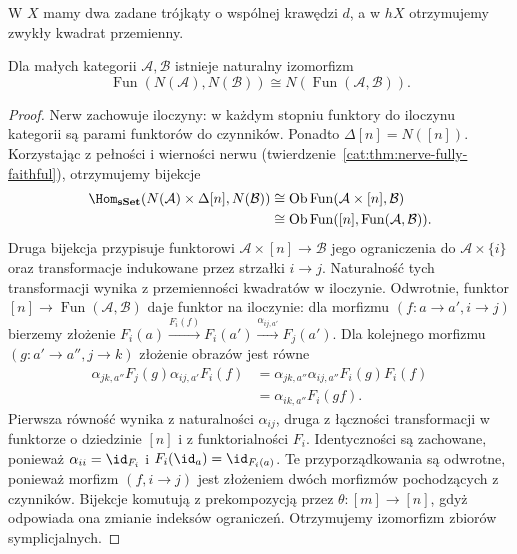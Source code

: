\begin{center}
\end{center}
W $X$ mamy dwa zadane trójkąty o wspólnej krawędzi $d$, a w $hX$ otrzymujemy zwykły kwadrat przemienny.

\begin{stwierdzenie}\label{cat:prop:quasicat-functor-nerve}
Dla małych kategorii $\mathcal A,\mathcal B$ istnieje naturalny izomorfizm
\[
 \operatorname{Fun}(N(\mathcal A),N(\mathcal B))
 \cong N(\operatorname{Fun}(\mathcal A,\mathcal B)).
\]
\end{stwierdzenie}
\begin{proof}
Nerw zachowuje iloczyny: w każdym stopniu funktory do iloczynu kategorii są parami funktorów do czynników. Ponadto $\Delta[n]=N([n])$. Korzystając z pełności i wierności nerwu (twierdzenie~\ref{cat:thm:nerve-fully-faithful}), otrzymujemy bijekcje
\[
\begin{aligned}
 \Hom_{\mathbf{sSet}}(N(\mathcal A)\times\Delta[n],N(\mathcal B))
 &\cong\operatorname{Ob}\operatorname{Fun}(\mathcal A\times[n],\mathcal B)\\
 &\cong\operatorname{Ob}\operatorname{Fun}([n],\operatorname{Fun}(\mathcal A,\mathcal B)).
\end{aligned}
\]
Druga bijekcja przypisuje funktorowi $\mathcal A\times[n]\to\mathcal B$ jego ograniczenia do $\mathcal A\times\{i\}$ oraz transformacje indukowane przez strzałki $i\to j$. Naturalność tych transformacji wynika z przemienności kwadratów w iloczynie. Odwrotnie, funktor $[n]\to\operatorname{Fun}(\mathcal A,\mathcal B)$ daje funktor na iloczynie: dla morfizmu $(f:a\to a',i\to j)$ bierzemy złożenie $F_i(a)\xrightarrow{F_i(f)}F_i(a')\xrightarrow{\alpha_{ij,a'}}F_j(a')$. Dla kolejnego morfizmu $(g:a'\to a'',j\to k)$ złożenie obrazów jest równe
\[
\begin{aligned}
 \alpha_{jk,a''}F_j(g)\alpha_{ij,a'}F_i(f)
 &=\alpha_{jk,a''}\alpha_{ij,a''}F_i(g)F_i(f)\\
 &=\alpha_{ik,a''}F_i(gf).
\end{aligned}
\]
Pierwsza równość wynika z naturalności $\alpha_{ij}$, druga z łączności transformacji w funktorze o dziedzinie $[n]$ i z funktorialności $F_i$. Identyczności są zachowane, ponieważ $\alpha_{ii}=\id_{F_i}$ i $F_i(\id_a)=\id_{F_i(a)}$. Te przyporządkowania są odwrotne, ponieważ morfizm $(f,i\to j)$ jest złożeniem dwóch morfizmów pochodzących z czynników. Bijekcje komutują z prekompozycją przez $\theta:[m]\to[n]$, gdyż odpowiada ona zmianie indeksów ograniczeń. Otrzymujemy izomorfizm zbiorów symplicjalnych.
\end{proof}

